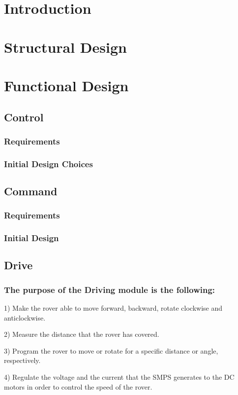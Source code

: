 \documentclass[a4paper]{article}
\begin{document}
\newpage

\section{Introduction}

\section{Structural Design}

\section{Functional Design}

\subsection{Control}
\subsubsection{Requirements}
\subsubsection{Initial Design Choices} 

\subsection{Command}
\subsubsection{Requirements}
\subsubsection{Initial Design}

\subsection{Drive}
\subsubsection{The purpose of the Driving module is the following:}
  \item1) Make the rover able to move forward, backward, rotate clockwise and anticlockwise.
  \item2) Measure the distance that the rover has covered. 
  \item3) Program the rover to move or rotate for a specific distance or angle, respectively.
  \item4) Regulate the voltage and the current that the SMPS generates to the DC motors in order to control the speed of the rover.
\end{document}
